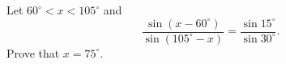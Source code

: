 Let $60^\circ<x<105^\circ$ and
\[
\dfrac{\sin(x-60^\circ)}{\sin(105^\circ-x)}=\dfrac{\sin15^\circ}{\sin30^\circ}.
\]
Prove that $x=75^\circ$.

